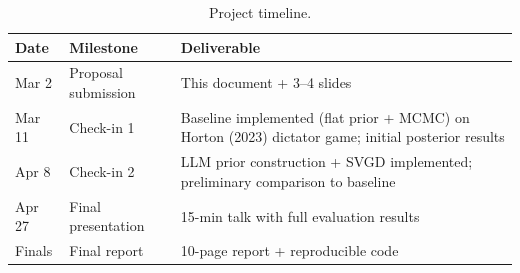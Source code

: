 \documentclass[11pt]{article}
\begin{document}
\begin{table}[h]
  \centering
  \small
  \begin{tabular}{llp{7cm}}
    \toprule
    \textbf{Date} & \textbf{Milestone} & \textbf{Deliverable} \\
    \midrule
    Mar 2   & Proposal submission  & This document + 3--4 slides \\
    Mar 11  & Check-in 1           & Baseline implemented (flat prior + MCMC) on
                                     Horton (2023) dictator game; initial
                                     posterior results \\
    Apr 8   & Check-in 2           & LLM prior construction + SVGD implemented;
                                     preliminary comparison to baseline \\
    Apr 27  & Final presentation   & 15-min talk with full evaluation results \\
    Finals  & Final report         & 10-page report + reproducible code \\
    \bottomrule
  \end{tabular}
  \caption{Project timeline.}
  \label{tab:timeline}
\end{table}



\end{document}
